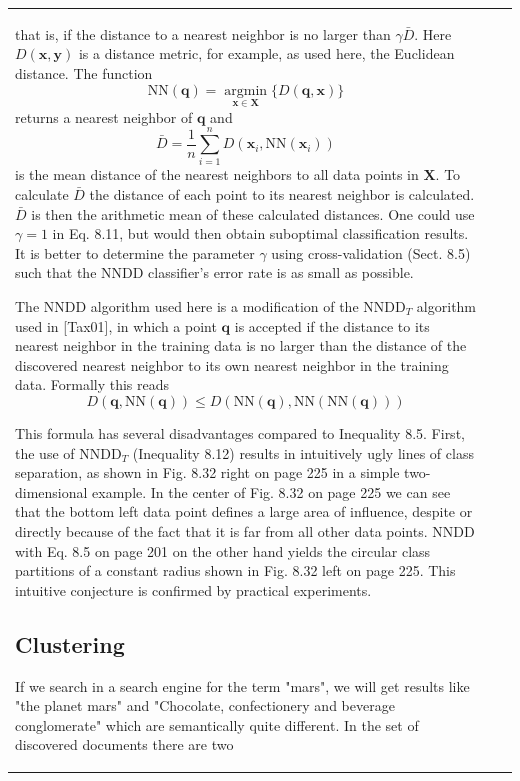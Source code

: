 \documentclass[10pt]{book}
\begin{document}
\begin{center}
\begin{tabular}{|l|l|l|}
that is, if the distance to a nearest neighbor is no larger than $\gamma \bar{D}$. Here $D(\boldsymbol{x}, \boldsymbol{y})$ is a distance metric, for example, as used here, the Euclidean distance. The function
\[
\mathrm{NN}(\boldsymbol{q})=\underset{\boldsymbol{x} \in \boldsymbol{X}}{\operatorname{argmin}}\{D(\boldsymbol{q}, \boldsymbol{x})\}
\]
returns a nearest neighbor of $\boldsymbol{q}$ and
\[
\bar{D}=\frac{1}{n} \sum_{i=1}^{n} D\left(\boldsymbol{x}_{i}, \mathrm{NN}\left(\boldsymbol{x}_{i}\right)\right)
\]
is the mean distance of the nearest neighbors to all data points in $\boldsymbol{X}$. To calculate $\bar{D}$ the distance of each point to its nearest neighbor is calculated. $\bar{D}$ is then the arithmetic mean of these calculated distances. One could use $\gamma=1$ in Eq. 8.11, but would then obtain suboptimal classification results. It is better to determine the parameter $\gamma$ using cross-validation (Sect. 8.5) such that the NNDD classifier's error rate is as small as possible.

The NNDD algorithm used here is a modification of the $\mathrm{NNDD}_{T}$ algorithm used in [Tax01], in which a point $\boldsymbol{q}$ is accepted if the distance to its nearest neighbor in the training data is no larger than the distance of the discovered nearest neighbor to its own nearest neighbor in the training data. Formally this reads
\begin{equation*}
D(\boldsymbol{q}, \mathrm{NN}(\boldsymbol{q})) \leq D(\mathrm{NN}(\boldsymbol{q}), \mathrm{NN}(\mathrm{NN}(\boldsymbol{q}))) \tag{8.12}
\end{equation*}

This formula has several disadvantages compared to Inequality 8.5. First, the use of $\mathrm{NNDD}_{T}$ (Inequality 8.12) results in intuitively ugly lines of class separation, as shown in Fig. 8.32 right on page 225 in a simple two-dimensional example. In the center of Fig. 8.32 on page 225 we can see that the bottom left data point defines a large area of influence, despite or directly because of the fact that it is far from all other data points. NNDD with Eq. 8.5 on page 201 on the other hand yields the circular class partitions of a constant radius shown in Fig. 8.32 left on page 225. This intuitive conjecture is confirmed by practical experiments.

\subsection{Clustering}
If we search in a search engine for the term "mars", we will get results like "the planet mars" and "Chocolate, confectionery and beverage conglomerate" which are semantically quite different. In the set of discovered documents there are two\\


\end{tabular}
\end{center}
\end{document}
